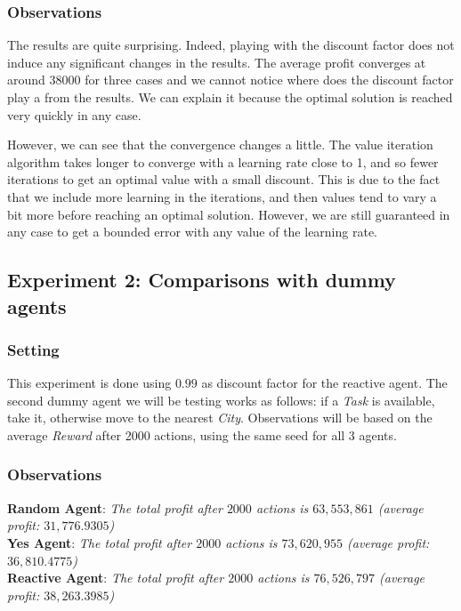 \documentclass[11pt]{article}
\begin{document}
\subsubsection{Observations}
The results are quite surprising. Indeed, playing with the discount factor does not induce any significant changes in the results. The average profit converges at around 38000 for three cases and we cannot notice where does the discount factor play a from the results. We can explain it because the optimal solution is reached very quickly in any case.

However, we can see that the convergence changes a little. The value iteration algorithm takes longer to converge with a learning rate close to 1, and so fewer iterations to get an optimal value with a small discount. This is due to the fact that we include more learning in the iterations, and then values tend to vary a bit more before reaching an optimal solution. However, we are still guaranteed in any case to get a bounded error with any value of the learning rate.

\subsection{Experiment 2: Comparisons with dummy agents}

\subsubsection{Setting}
This experiment is done using $0.99$ as discount factor for the reactive agent.
The second dummy agent we will be testing works as follows: if a \textit{Task} is available, take it, otherwise move to the nearest \textit{City}.
Observations will be based on the average \textit{Reward} after 2000 actions, using the same seed for all 3 agents.
\subsubsection{Observations}

\textbf{Random Agent}:
\textit{The total profit after $2000$ actions is $63,553,861$ (average profit: $31,776.9305$)}\\
\textbf{Yes Agent}:
\textit{The total profit after $2000$ actions is $73,620,955$ (average profit: $36,810.4775$)}\\
\textbf{Reactive Agent}:
\textit{The total profit after $2000$ actions is $76,526,797$ (average profit: $38,263.3985$)}\\
\end{document}
